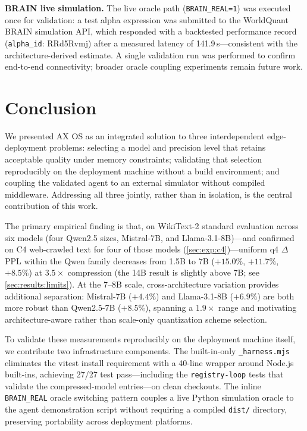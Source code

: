 \documentclass[10pt,twocolumn]{article}
\begin{document}
\textbf{BRAIN live simulation.}  The live oracle path
(\texttt{BRAIN\_REAL=1}) was executed once for validation: a test alpha
expression was submitted to the WorldQuant BRAIN simulation API, which responded
with a backtested performance record (\texttt{alpha\_id}: RRd5Rvmj) after a
measured latency of 141.9\,s---consistent with the architecture-derived
estimate.  A single validation run was performed to confirm end-to-end
connectivity; broader oracle coupling experiments remain future work.

\section{Conclusion}
\label{sec:conclusion}

We presented AX OS as an integrated solution to three interdependent
edge-deployment problems: selecting a model and precision level that retains
acceptable quality under memory constraints; validating that selection
reproducibly on the deployment machine without a build environment; and coupling
the validated agent to an external simulator without compiled middleware.
Addressing all three jointly, rather than in isolation, is the central
contribution of this work.

The primary empirical finding is that, on WikiText-2 standard evaluation across
six models (four Qwen2.5 sizes, Mistral-7B, and Llama-3.1-8B)---and confirmed
on C4 web-crawled text for four of those models (\cref{sec:exp:c4})---uniform q4 $\Delta$PPL
within the Qwen family decreases from 1.5B to 7B
($+15.0\%$, $+11.7\%$, $+8.5\%$) at $3.5\times$ compression (the 14B
result is slightly above 7B; see \cref{sec:results:limits}).  At the 7--8B
scale, cross-architecture variation provides additional separation:
Mistral-7B ($+4.4\%$) and Llama-3.1-8B ($+6.9\%$) are both more robust than
Qwen2.5-7B ($+8.5\%$), spanning a $1.9\times$ range and motivating
architecture-aware rather than scale-only quantization scheme selection.

To validate these measurements reproducibly on the deployment machine itself,
we contribute two infrastructure components.  The built-in-only
\texttt{\_harness.mjs} eliminates the vitest install requirement with a 40-line
wrapper around Node.js built-ins, achieving 27/27 test pass---including the
\texttt{registry-loop} tests that validate the compressed-model
entries---on clean checkouts.  The inline \texttt{BRAIN\_REAL} oracle switching
pattern couples a live Python simulation oracle to the agent demonstration
script without requiring a compiled \texttt{dist/} directory, preserving
portability across deployment platforms.
\end{document}
